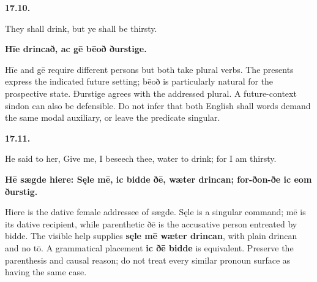 \par\begin{minipage}{\linewidth}\raggedright
\textbf{17.10.}

They shall drink, but ye shall be thirsty.

\textbf{Hīe drincað, ac gē bēoð ðurstige.}

Hīe and gē require different persons but both take plural verbs. The presents express the indicated future setting; bēoð is particularly natural for the prospective state. Ðurstige agrees with the addressed plural. A future-context sindon can also be defensible. Do not infer that both English shall words demand the same modal auxiliary, or leave the predicate singular.

\end{minipage}\par\addvspace{4pt}

\par\begin{minipage}{\linewidth}\raggedright
\textbf{17.11.}

He said to her, Give me, I beseech thee, water to drink; for I am thirsty.

\textbf{Hē sægde hiere: Sęle mē, ic bidde ðē, wæter drincan; for-ðon-ðe ic eom ðurstig.}

Hiere is the dative female addressee of sægde. Sęle is a singular command; mē is its dative recipient, while parenthetic ðē is the accusative person entreated by bidde. The visible help supplies \textbf{sęle mē wæter drincan}, with plain drincan and no tō. A grammatical placement \textbf{ic ðē bidde} is equivalent. Preserve the parenthesis and causal reason; do not treat every similar pronoun surface as having the same case.

\end{minipage}\par\addvspace{4pt}

